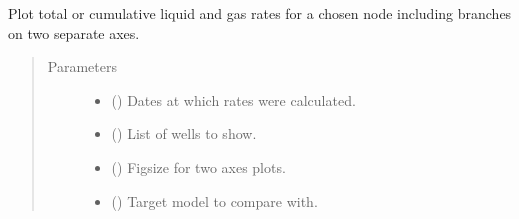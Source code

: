 \documentclass[letterpaper,10pt,english]{sphinxmanual}
\begin{document}
\begin{fulllineitems}
\begin{fulllineitems}
\begin{quote}
\begin{description}
\begin{itemize}
\end{itemize}

\end{description}\end{quote}

\end{fulllineitems}


\begin{fulllineitems}
\label{\detokenize{api/wells:geology.src.wells.Wells.show_rates2}}
Plot total or cumulative liquid and gas rates for a chosen node including branches
on two separate axes.
\begin{quote}\begin{description}
\item[{Parameters}] \leavevmode\begin{itemize}
\item {} 
 () \textendash{} Dates at which rates were calculated.

\item {} 
 () \textendash{} List of wells to show.

\item {} 
 () \textendash{} Figsize for two axes plots.

\item {} 
 ({\hyperref[\detokenize{api/wells:geology.src.wells.Wells}]{}}) \textendash{} Target model to compare with.

\end{itemize}

\end{description}\end{quote}

\end{fulllineitems}


\end{fulllineitems}
\end{document}
